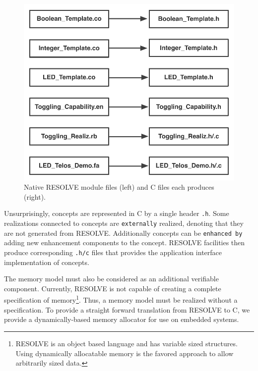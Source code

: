 \begin{figure}
\begin{center}
\includegraphics[scale=.55]{figs/relationship.pdf}
\end{center}
\caption{Native RESOLVE module files (left) and C files each produces (right).}
\label{fig:relationship}
\end{figure}

Unsurprisingly, concepts are represented in C by a single header \texttt{.h}. Some realizations connected to concepts are \texttt{externally} realized, denoting that they are not generated from RESOLVE. Additionally concepts can be \texttt{enhanced by} adding new enhancement components to the concept. RESOLVE facilities then produce corresponding \texttt{.h/c} files that provides the application interface implementation of concepts.

The memory model must also be considered as an additional verifiable component. Currently, RESOLVE is not capable of creating a complete specification of memory\footnote{RESOLVE is an object based language and has variable sized structures. Using dynamically allocatable memory is the favored approach to allow arbitrarily sized data.}. Thus, a memory model must be realized without a specification. To provide a straight forward translation from RESOLVE to C, we provide a dynamically-based memory allocator for use on embedded systems.




